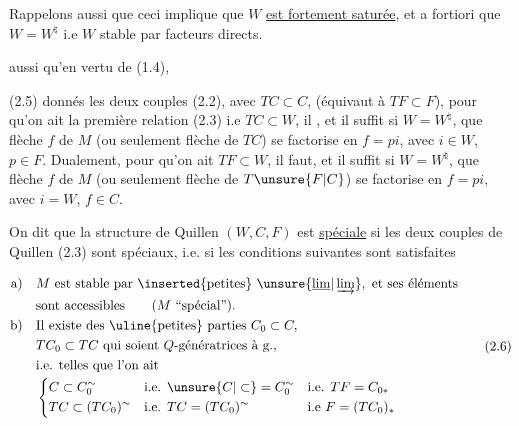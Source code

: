 Rappelons aussi que ceci implique que $W$ \uline{est fortement saturée},
et a fortiori que $W=W^{\natural}$ i.e
$W$ stable par facteurs directs.

 aussi qu'en vertu de (1.4),  

(2.5)  donnés les deux couples (2.2), avec $TC\subset C$,
 (équivaut à $TF\subset F$), pour qu'on ait
la première relation (2.3) i.e $TC\subset W$, il 
, et il suffit si $W=W^{\natural}$, que  flèche $f$
de $M$ (ou seulement  flèche de $TC$) se
factorise en $f=pi$, avec $i\in W$, $p\in F$. Dualement,
pour qu'on ait $TF\subset W$, il faut, et il
suffit si $W=W^{\natural}$, que  flèche $f$ de $M$
(ou seulement  flèche de $T\unsure{F|C}$) se factorise
en $f=pi$, avec $i=W$, $f\in C$.


On dit que la structure de Quillen $(W,C,F)$
est \uline{spéciale} si les deux couples de Quillen
(2.3) sont spéciaux, i.e. si les conditions
suivantes sont satisfaites

\[
\begin{aligned}
\text{a)}\quad &M\ \text{est stable par \inserted{petites} }\unsure{\underline{\lim}|\varinjlim},\ \text{et ses éléments}\\
&\text{sont accessibles}\qquad(M\text{ ``spécial''}).\\
\text{b)}\quad &\text{Il existe des \uline{petites} parties }C_0\subset C,\\
&TC_0\subset TC\ \text{qui soient } Q\text{-génératrices à g.,}\\
&\text{i.e. telles que l'on ait}\\[-1pt]
&\left\{\begin{aligned}
&C\subset C_0^{\sim} &&\text{i.e. } \unsure{C|\subset}=C_0^{\sim} &&\text{i.e. } TF=C_{0*}\\
&TC\subset(TC_0)^{\sim} &&\text{i.e. } TC=(TC_0)^{\sim} &&\text{i.e } F=(TC_0)_*
\end{aligned}\right.
\end{aligned}\tag*{(2.6)}
\]

